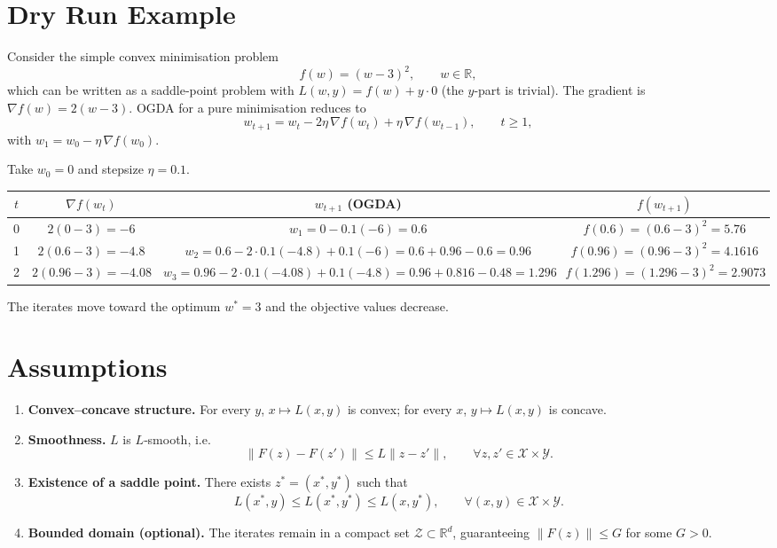 \documentclass{article}
\begin{document}
\section*{Dry Run Example}
Consider the simple convex minimisation problem
\[
f(w)=(w-3)^2,\qquad w\in\mathbb R,
\]
which can be written as a saddle‑point problem with $L(w,y)=f(w)+y\cdot 0$ (the $y$‑part is trivial).  
The gradient is $\nabla f(w)=2(w-3)$.  
OGDA for a pure minimisation reduces to
\[
w_{t+1}=w_{t}-2\eta\,\nabla f(w_{t})+\eta\,\nabla f(w_{t-1}),
\qquad t\ge 1,
\]
with $w_{1}=w_{0}-\eta\,\nabla f(w_{0})$.

Take $w_{0}=0$ and stepsize $\eta=0.1$.

\begin{center}
\begin{tabular}{c|c|c|c}
$t$ & $\nabla f(w_{t})$ & $w_{t+1}$ (OGDA) & $f(w_{t+1})$\\\hline
0 & $2(0-3)=-6$ & $w_{1}=0-0.1(-6)=0.6$ & $f(0.6)= (0.6-3)^2=5.76$\\[2mm]
1 & $2(0.6-3)=-4.8$ & $w_{2}=0.6-2\cdot0.1(-4.8)+0.1(-6)=0.6+0.96-0.6=0.96$ & $f(0.96)= (0.96-3)^2=4.1616$\\[2mm]
2 & $2(0.96-3)=-4.08$ & $w_{3}=0.96-2\cdot0.1(-4.08)+0.1(-4.8)=0.96+0.816-0.48=1.296$ & $f(1.296)= (1.296-3)^2=2.9073$
\end{tabular}
\end{center}
The iterates move toward the optimum $w^{*}=3$ and the objective values decrease.

\newpage
\section*{Assumptions}
\begin{enumerate}[label=\textbf{A\arabic*}, leftmargin=*]
\item \textbf{Convex–concave structure.} For every $y$, $x\mapsto L(x,y)$ is convex; for every $x$, $y\mapsto L(x,y)$ is concave.
\item \textbf{Smoothness.} $L$ is $L$‑smooth, i.e.
\[
\|F(z)-F(z')\|\le L\|z-z'\|,\qquad\forall z,z'\in\mathcal X\times\mathcal Y .
\tag{A2}
\]
\item \textbf{Existence of a saddle point.} There exists $z^{*}=(x^{*},y^{*})$ such that
\[
L(x^{*},y)\le L(x^{*},y^{*})\le L(x,y^{*}),\qquad\forall (x,y)\in\mathcal X\times\mathcal Y .
\tag{A3}
\]
\item \textbf{Bounded domain (optional).} The iterates remain in a compact set $\mathcal Z\subset\mathbb R^{d}$, guaranteeing $\|F(z)\|\le G$ for some $G>0$.
\end{enumerate}
\end{document}
